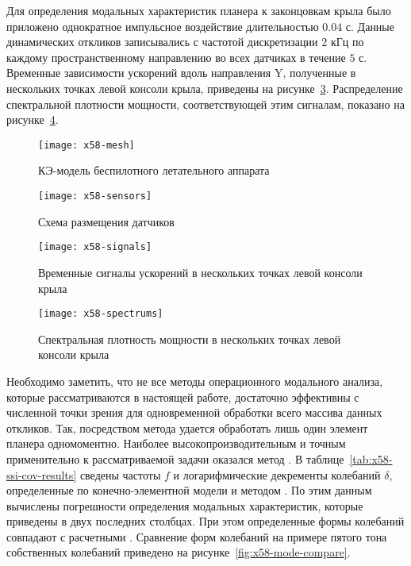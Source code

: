 Для определения модальных характеристик планера к законцовкам крыла было приложено однократное импульсное воздействие длительностью $ 0.04 $ с. Данные динамических откликов записывались с частотой дискретизации $ 2 $ кГц по каждому пространственному направлению во всех датчиках в течение $ 5 $ с. Временные зависимости ускорений вдоль направления Y, полученные в нескольких точках левой консоли крыла, приведены на рисунке~\ref{fig:x58-signals}. Распределение спектральной плотности мощности, соответствующей этим сигналам, показано на рисунке~\ref{fig:x58-spectrums}.

\begin{figure}[!htb]
	\centerfloat
	\texttt{[image: x58-mesh]}
	\caption{КЭ-модель беспилотного летательного аппарата} \label{fig:x58-mesh}
\end{figure}

\begin{figure}[!htb]
	\centerfloat
	\texttt{[image: x58-sensors]}
	\caption{Схема размещения датчиков} \label{fig:x58-sensors}
\end{figure}

\begin{figure}[!htb]
	\centerfloat
	\texttt{[image: x58-signals]}
	\caption{Временные сигналы ускорений в нескольких точках левой консоли крыла} \label{fig:x58-signals}
\end{figure}

\begin{figure}[!htb]
	\centerfloat
	\texttt{[image: x58-spectrums]}
	\caption{Спектральная плотность мощности в нескольких точках левой консоли крыла} \label{fig:x58-spectrums}
\end{figure}

Необходимо заметить, что не все методы операционного модального анализа, которые рассматриваются в настоящей работе, достаточно эффективны с численной точки зрения для одновременной обработки всего массива данных откликов. Так, посредством метода  удается обработать лишь один элемент планера одномоментно. Наиболее высокопроизводительным и точным применительно к рассматриваемой задачи оказался метод . В таблице~\ref{tab:x58-ssi-cov-results} сведены частоты $ f $ и логарифмические декременты колебаний $ \delta $, определенные по конечно-элементной модели и методом . По этим данным вычислены погрешности определения модальных характеристик, которые приведены в двух последних столбцах. При этом определенные формы колебаний  совпадают с расчетными . Сравнение форм колебаний на примере пятого тона собственных колебаний приведено на рисунке~\ref{fig:x58-mode-compare}. 

